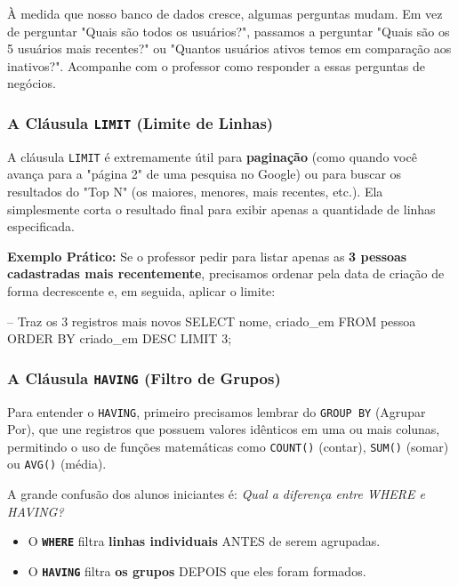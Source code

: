 \documentclass[12pt,a4paper,openright]{book}
\begin{document}
\begin{tcolorbox}[colback=blue!5,colframe=blue!40!black,title=Exercício Dirigido com o Professor: Top Resultados e Agrupamentos]
À medida que nosso banco de dados cresce, algumas perguntas mudam. Em vez de perguntar "Quais são todos os usuários?", passamos a perguntar "Quais são os 5 usuários mais recentes?" ou "Quantos usuários ativos temos em comparação aos inativos?". Acompanhe com o professor como responder a essas perguntas de negócios.
\end{tcolorbox}

\subsubsection{A Cláusula \texttt{LIMIT} (Limite de Linhas)}

A cláusula \texttt{LIMIT} é extremamente útil para \textbf{paginação} (como quando você avança para a "página 2" de uma pesquisa no Google) ou para buscar os resultados do "Top N" (os maiores, menores, mais recentes, etc.). Ela simplesmente corta o resultado final para exibir apenas a quantidade de linhas especificada.


\textbf{Exemplo Prático:} Se o professor pedir para listar apenas as \textbf{3 pessoas cadastradas mais recentemente}, precisamos ordenar pela data de criação de forma decrescente e, em seguida, aplicar o limite:

\begin{sqlcode}
-- Traz os 3 registros mais novos
SELECT nome, criado_em
FROM pessoa
ORDER BY criado_em DESC
LIMIT 3;
\end{sqlcode}

\subsubsection{A Cláusula \texttt{HAVING} (Filtro de Grupos)}

Para entender o \texttt{HAVING}, primeiro precisamos lembrar do \texttt{GROUP BY} (Agrupar Por), que une registros que possuem valores idênticos em uma ou mais colunas, permitindo o uso de funções matemáticas como \texttt{COUNT()} (contar), \texttt{SUM()} (somar) ou \texttt{AVG()} (média).

A grande confusão dos alunos iniciantes é: \textit{Qual a diferença entre WHERE e HAVING?}
\begin{itemize}
    \item O \textbf{\texttt{WHERE}} filtra \textbf{linhas individuais} ANTES de serem agrupadas.
    \item O \textbf{\texttt{HAVING}} filtra \textbf{os grupos} DEPOIS que eles foram formados.
\end{itemize}
\end{document}

